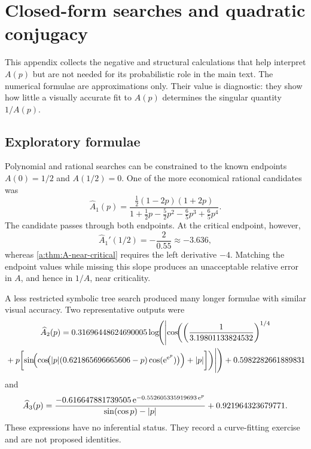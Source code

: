 \section{Closed-form searches and quadratic conjugacy}
\label{a:app:closed-form-search}

This appendix collects the negative and structural calculations that help interpret
\(A(p)\) but are not needed for its probabilistic role in the main text.  The
numerical formulae are approximations only.  Their value is diagnostic: they show
how little a visually accurate fit to \(A(p)\) determines the singular quantity
\(1/A(p)\).

\subsection{Exploratory formulae}

Polynomial and rational searches can be constrained to the known endpoints
\(A(0)=1/2\) and \(A(1/2)=0\).  One of the more economical rational candidates was
\begin{equation}
  \widehat A_1(p)
  =
  \frac{\tfrac12(1-2p)(1+2p)}
       {1+\tfrac12p-\tfrac52p^2-\tfrac65p^3+\tfrac65p^4}.
  \label{a:eq:Ahat1}
\end{equation}
The candidate passes through both endpoints.  At the critical endpoint, however,
\begin{equation}
  \widehat A_1'(1/2)=-\frac{2}{0.55}\approx-3.636,
\end{equation}
whereas \cref{a:thm:A-near-critical} requires the left derivative \(-4\).
Matching the endpoint values while missing this slope produces an unacceptable
relative error in \(A\), and hence in \(1/A\), near criticality.

A less restricted symbolic tree search produced many longer formulae with similar
visual accuracy.  Two representative outputs were
\begin{multline}
  \widehat A_2(p)
  =0.31696448624690005
  \log\!\Biggl(
  \Biggl|\cos\!\biggl(
  \left(\frac{1}{3.19801133824532}\right)^{1/4}\\
  {}+p\biggl[
  \sin\!\Bigl(
    \cos\!\bigl(|p|(0.621865696665606-p)
    \cos(\mathrm{e}^{\mathrm{e}^p})\bigr)
  \Bigr)+|p|
  \biggr]\biggr)\Biggr|
  \Biggr)
  +0.5982282661889831
  \label{a:eq:Ahat2}
\end{multline}
and
\begin{equation}
  \widehat A_3(p)
  =
  \frac{-0.616647881739505\,
  \mathrm{e}^{-0.552605335919693\,\mathrm{e}^p}}
  {\sin(\cos p)-|p|}
  +0.921964323679771.
  \label{a:eq:Ahat3}
\end{equation}
These expressions have no inferential status.  They record a curve-fitting
exercise and are not proposed identities.

